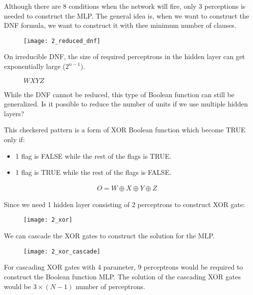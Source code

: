 \hfill\break
Although there are 8 conditions when the network will fire, only 3 perceptions is needed to construct the MLP. The general idea is, when we want to construct the DNF formula, we want to construct it with thee minimum number of clauses.

\begin{figure}[H]
	\centering
	\texttt{[image: 2\_reduced\_dnf]}
\end{figure}

\hfill\break
On irreducible DNF, the size of required perceptrons in the hidden layer can get exponentially large ($2^{n-1}$).

\begin{figure}[H]
	\centering
	\begin{Karnaugh}{$WX$}{$YZ$}
	\end{Karnaugh}
\end{figure}

\hfill\break
While the DNF cannot be reduced, this type of Boolean function can still be generalized. Is it possible to reduce the number of units if we use multiple hidden layers?

This checkered pattern is a form of XOR Boolean function which become TRUE only if:
\begin{itemize}
	\item 1 flag is FALSE while the rest of the flags is TRUE.
	\item 1 flag is TRUE while the rest of the flags is FALSE.
\end{itemize}

\begin{align}
	O = W \oplus X \oplus Y \oplus Z
\end{align}

\hfill\break
Since we need 1 hidden layer consisting of 2 perceptrons to construct XOR gate:

\begin{figure}[H]
	\centering
	\texttt{[image: 2\_xor]}
\end{figure}

\hfill\break
We can cascade the XOR gates to construct the solution for the MLP.

\begin{figure}[H]
	\centering
	\texttt{[image: 2\_xor\_cascade]}
\end{figure}

\hfill\break
For cascading XOR gates with 4 parameter, 9 perceptrons would be required to construct the Boolean function MLP. The solution of the cascading XOR gates would be $3\times (N-1)$ number of perceptrons. 

